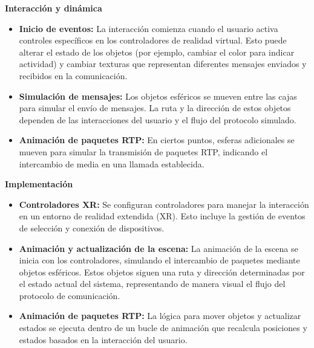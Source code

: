 \documentclass[a4paper, 12pt]{book}
\begin{document}
\textbf{Interacción y dinámica}

\begin{itemize}
  \item \textbf{Inicio de eventos:} La interacción comienza cuando el usuario activa controles específicos en los controladores de realidad virtual. 
  Esto puede alterar el estado de los objetos (por ejemplo, cambiar el color para indicar actividad) y cambiar texturas que 
  representan diferentes mensajes enviados y recibidos en la comunicación.
  
  \item \textbf{Simulación de mensajes:} Los objetos esféricos se mueven entre las cajas para simular el envío de mensajes. 
  La ruta y la dirección de estos objetos dependen de las interacciones del usuario y el flujo del protocolo simulado.

  \item \textbf{Animación de paquetes RTP:} En ciertos puntos, esferas adicionales se mueven para simular la transmisión de paquetes RTP, 
  indicando el intercambio de media en una llamada establecida.
  
\end{itemize}


\textbf{Implementación}

\begin{itemize}
  \item \textbf{Controladores XR:} Se configuran controladores para manejar la interacción en un entorno de realidad extendida (XR). 
  Esto incluye la gestión de eventos de selección y conexión de dispositivos.
  
  \item \textbf{Animación y actualización de la escena:} La animación de la escena se inicia con los controladores, simulando el intercambio de 
  paquetes mediante objetos esféricos. Estos objetos siguen una ruta y dirección determinadas por el estado actual del sistema, representando de 
  manera visual el flujo del protocolo de comunicación.

  \item \textbf{Animación de paquetes RTP:} La lógica para mover objetos y actualizar estados se ejecuta dentro de un bucle 
  de animación que recalcula posiciones y estados basados en la interacción del usuario.
  
\end{itemize}
\end{document}
